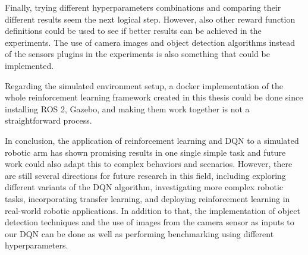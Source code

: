\documentclass[12pt,oneside]{article}
\begin{document}
Finally, trying different hyperparameters combinations and comparing their different results seem the next logical step. However, also other reward function definitions could be used to see if better results can be achieved in the experiments. The use of camera images and object detection algorithms instead of the sensors plugins in the experiments is also something that could be implemented.

Regarding the simulated environment setup, a docker implementation of the whole reinforcement learning framework created in this thesis could be done since installing ROS 2, Gazebo, and making them work together is not a straightforward process.

In conclusion, the application of reinforcement learning and DQN to a simulated robotic arm has shown promising results in one single simple task and future work could also adapt this to complex behaviors and scenarios. However, there are still several directions for future research in this field, including exploring different variants of the DQN algorithm, investigating more complex robotic tasks, incorporating transfer learning, and deploying reinforcement learning in real-world robotic applications. In addition to that, the implementation of object detection techniques and the use of images from the camera sensor as inputs to our DQN can be done as well as performing benchmarking using different hyperparameters.


%
%
\end{document}
